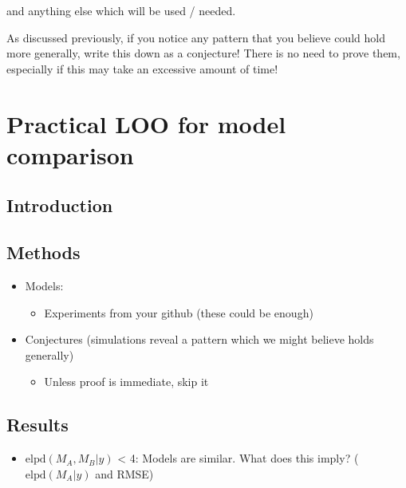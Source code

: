 and anything else which will be used / needed.

As discussed previously, if you notice any pattern that you believe
could hold more generally, write this down as a conjecture! There is no
need to prove them, especially if this may take an excessive amount of
time!

\hypertarget{practical-loo-for-model-comparison}{%
\section{Practical LOO for model
comparison}\label{practical-loo-for-model-comparison}}

\hypertarget{introduction}{%
\subsection{Introduction}\label{introduction}}

\hypertarget{methods}{%
\subsection{Methods}\label{methods}}

\begin{itemize}
\tightlist
\item
  Models:

  \begin{itemize}
  \tightlist
  \item
    Experiments from your github (these could be enough)
  \end{itemize}
\item
  Conjectures (simulations reveal a pattern which we might believe holds
  generally)

  \begin{itemize}
  \tightlist
  \item
    Unless proof is immediate, skip it
  \end{itemize}
\end{itemize}

\hypertarget{results}{%
\subsection{Results}\label{results}}

\begin{itemize}
\tightlist
\item
  \(\mathrm{elpd}(M_A, M_B | y)\) \textless{} 4: Models are similar.
  What does this imply? (\(\mathrm{elpd}(M_A | y)\) and RMSE)
\end{itemize}

